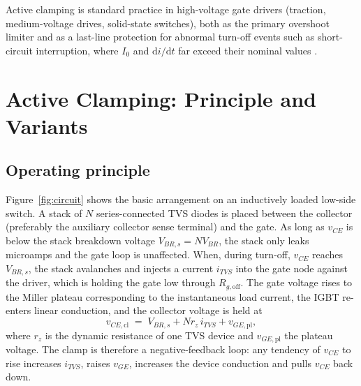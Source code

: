 \documentclass[11pt,a4paper]{article}
\newcommand{\ud}{\mathrm{d}}
\begin{document}
Active clamping is standard practice in high-voltage gate drivers
(traction, medium-voltage drives, solid-state switches), both as the
primary overshoot limiter and as a last-line protection for abnormal
turn-off events such as short-circuit interruption, where $I_0$ and
$\ud i/\ud t$ far exceed their nominal values \cite{volke,abb2053}.

\section{Active Clamping: Principle and Variants}

\subsection{Operating principle}

Figure~\ref{fig:circuit} shows the basic arrangement on an inductively
loaded low-side switch. A stack of $N$ series-connected TVS diodes is
placed between the collector (preferably the auxiliary collector sense
terminal) and the gate. As long as $v_{CE}$ is below the stack breakdown
voltage $V_{BR,s} = N V_{BR}$, the stack only leaks microamps and the
gate loop is unaffected. When, during turn-off, $v_{CE}$ reaches
$V_{BR,s}$, the stack avalanches and injects a current $i_{TVS}$ into
the gate node against the driver, which is holding the gate low through
$R_{g,\mathrm{off}}$. The gate voltage rises to the Miller plateau
corresponding to the instantaneous load current, the IGBT re-enters
linear conduction, and the collector voltage is held at
%
\begin{equation}
  v_{CE,\mathrm{cl}} \;=\; V_{BR,s} + N r_z\, i_{TVS} + v_{GE,\mathrm{pl}} ,
  \label{eq:vclamp}
\end{equation}
%
where $r_z$ is the dynamic resistance of one TVS device and
$v_{GE,\mathrm{pl}}$ the plateau voltage. The clamp is therefore a
negative-feedback loop: any tendency of $v_{CE}$ to rise increases
$i_{TVS}$, raises $v_{GE}$, increases the device conduction and pulls
$v_{CE}$ back down.
\end{document}
